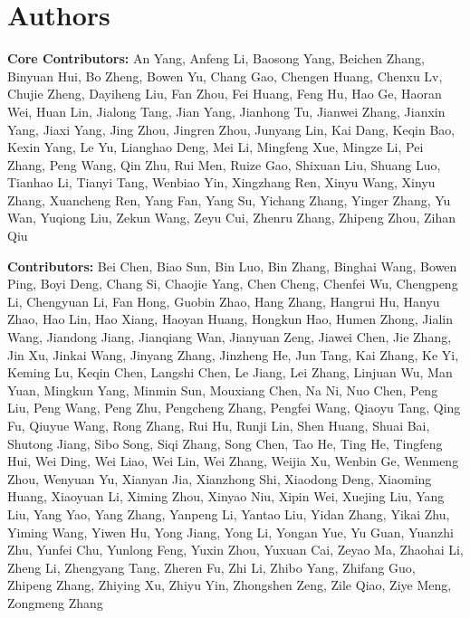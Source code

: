 \section{Authors}

\textbf{Core Contributors:} An Yang, Anfeng Li, Baosong Yang, Beichen Zhang, Binyuan Hui, Bo Zheng, Bowen Yu, Chang Gao, Chengen Huang, Chenxu Lv, Chujie Zheng, Dayiheng Liu, Fan Zhou, Fei Huang, Feng Hu, Hao Ge, Haoran Wei, Huan Lin, Jialong Tang, Jian Yang, Jianhong Tu, Jianwei Zhang, Jianxin Yang, Jiaxi Yang, Jing Zhou, Jingren Zhou, Junyang Lin, Kai Dang, Keqin Bao, Kexin Yang, Le Yu, Lianghao Deng, Mei Li, Mingfeng Xue, Mingze Li, Pei Zhang, Peng Wang, Qin Zhu, Rui Men, Ruize Gao, Shixuan Liu, Shuang Luo, Tianhao Li, Tianyi Tang, Wenbiao Yin, Xingzhang Ren, Xinyu Wang, Xinyu Zhang, Xuancheng Ren, Yang Fan, Yang Su, Yichang Zhang, Yinger Zhang, Yu Wan, Yuqiong Liu, Zekun Wang, Zeyu Cui, Zhenru Zhang, Zhipeng Zhou, Zihan Qiu

\textbf{Contributors:} Bei Chen, Biao Sun, Bin Luo, Bin Zhang, Binghai Wang, Bowen Ping, Boyi Deng, Chang Si, Chaojie Yang, Chen Cheng, Chenfei Wu, Chengpeng Li, Chengyuan Li, Fan Hong, Guobin Zhao, Hang Zhang, Hangrui Hu, Hanyu Zhao, Hao Lin, Hao Xiang, Haoyan Huang, Hongkun Hao, Humen Zhong, Jialin Wang, Jiandong Jiang, Jianqiang Wan, Jianyuan Zeng, Jiawei Chen, Jie Zhang, Jin Xu, Jinkai Wang, Jinyang Zhang, Jinzheng He, Jun Tang, Kai Zhang, Ke Yi, Keming Lu, Keqin Chen, Langshi Chen, Le Jiang, Lei Zhang, Linjuan Wu, Man Yuan, Mingkun Yang, Minmin Sun, Mouxiang Chen, Na Ni, Nuo Chen, Peng Liu, Peng Wang, Peng Zhu, Pengcheng Zhang, Pengfei Wang, Qiaoyu Tang, Qing Fu, Qiuyue Wang, Rong Zhang, Rui Hu, Runji Lin, Shen Huang, Shuai Bai, Shutong Jiang, Sibo Song, Siqi Zhang, Song Chen, Tao He, Ting He, Tingfeng Hui, Wei Ding, Wei Liao, Wei Lin, Wei Zhang, Weijia Xu, Wenbin Ge, Wenmeng Zhou, Wenyuan Yu, Xianyan Jia, Xianzhong Shi, Xiaodong Deng, Xiaoming Huang, Xiaoyuan Li, Ximing Zhou, Xinyao Niu, Xipin Wei, Xuejing Liu, Yang Liu, Yang Yao, Yang Zhang, Yanpeng Li, Yantao Liu, Yidan Zhang, Yikai Zhu, Yiming Wang, Yiwen Hu, Yong Jiang, Yong Li, Yongan Yue, Yu Guan, Yuanzhi Zhu, Yunfei Chu, Yunlong Feng, Yuxin Zhou, Yuxuan Cai, Zeyao Ma, Zhaohai Li, Zheng Li, Zhengyang Tang, Zheren Fu, Zhi Li, Zhibo Yang, Zhifang Guo, Zhipeng Zhang, Zhiying Xu, Zhiyu Yin, Zhongshen Zeng, Zile Qiao, Ziye Meng, Zongmeng Zhang
